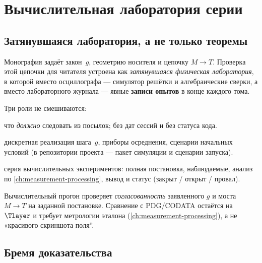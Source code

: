 \chapter{Вычислительная лаборатория серии}
\label{ch:computational-laboratory}

\section{Затянувшаяся лаборатория, а не только теоремы}
\label{sec:lab-role}

Монография задаёт закон~$g$, геометрию носителя и цепочку $M\to T$.
Проверка этой цепочки для читателя устроена как \emph{затянувшаяся физическая лаборатория},
в которой вместо осциллографа --- симулятор решётки и алгебраические сверки,
а вместо лабораторного журнала --- явные \textbf{записи опытов} в конце каждого тома.

Три роли не смешиваются:
\begin{description}[style=nextline,leftmargin=3.2cm]
\item[\textbf{Теория (MODEL)}]
  что \emph{должно} следовать из посылок; без дат сессий и без статуса кода.
\item[\textbf{Аппарат}]
  дискретная реализация шага~$g$, приборы осреднения, сценарии начальных условий
  (в репозитории проекта --- пакет симуляции и сценарии запуска).
\item[\textbf{Журнал прогонов}]
  серия вычислительных экспериментов: полная постановка, наблюдаемые,
  анализ по \cref{ch:measurement-processing}, вывод и статус (закрыт / открыт / провал).
\end{description}

\begin{remark}
Вычислительный прогон проверяет \emph{согласованность} заявленного $g$ и моста $M\to T$
на заданной постановке.
Сравнение с PDG/CODATA остаётся на~$\Tlayer$ и требует метрологии эталона
(\cref{ch:measurement-processing}), а не «красивого скриншота поля''.
\end{remark}

\section{Бремя доказательства}
\label{sec:lab-burden-of-proof}

